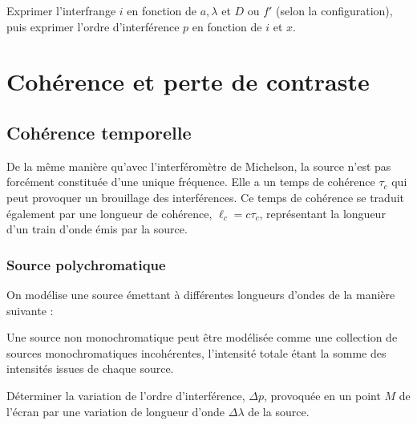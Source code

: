 \documentclass[11pt,fleqn]{book} %
\begin{document}
\begin{capex}
	Exprimer l'interfrange $i$ en fonction de $a, \lambda$ et $D$ ou $f'$ (selon la configuration), puis exprimer l'ordre d'interférence $p$ en fonction de $i$ et $x$.
\end{capex}

\section{Cohérence et perte de contraste}

\subsection{Cohérence temporelle}

De la même manière qu'avec l'interféromètre de Michelson, la source n'est pas forcément constituée d'une unique fréquence. Elle a un temps de cohérence $\tau_c$ qui peut provoquer un brouillage des interférences. Ce temps de cohérence se traduit également par une longueur de cohérence, $\ell_c = c \tau_c$, représentant la longueur d'un train d'onde émis par la source.

\subsubsection{Source polychromatique}

On modélise une source émettant à différentes longueurs d'ondes de la manière suivante :

\begin{proposition}
	Une source non monochromatique peut être modélisée comme une collection de sources monochromatiques incohérentes, l'intensité totale étant la somme des intensités issues de chaque source.
\end{proposition}

\begin{capex}
	Déterminer la variation de l'ordre d'interférence, $\Delta p$, provoquée en un point $M$ de l'écran par une variation de longueur d'onde $\Delta \lambda$ de la source.
\end{capex}
\end{document}
